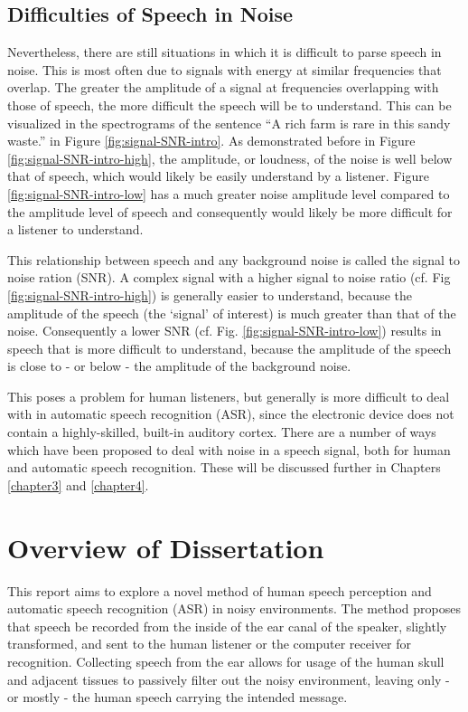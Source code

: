 \subsection{Difficulties of Speech in Noise}\label{sec:snr-difficult}

Nevertheless, there are still situations in which it is difficult to parse speech in noise.  This is most often due to signals with energy at similar frequencies that overlap.  The greater the amplitude of a signal at frequencies overlapping with those of speech, the more difficult the speech will be to understand.  This can be visualized in the spectrograms of the sentence ``A rich farm is rare in this sandy waste.'' in Figure \ref{fig:signal-SNR-intro}.  As demonstrated before in Figure \ref{fig:signal-SNR-intro-high}, the amplitude, or loudness, of the noise is well below that of speech, which would likely be easily understand by a listener.  Figure \ref{fig:signal-SNR-intro-low} has a much greater noise amplitude level compared to the amplitude level of speech and consequently would likely be more difficult for a listener to understand.

This relationship between speech and any background noise is called the signal to noise ration (SNR).  A complex signal with a higher signal to noise ratio (cf. Fig \ref{fig:signal-SNR-intro-high}) is generally easier to understand, because the amplitude of the speech (the `signal' of interest) is much greater than that of the noise.  Consequently a lower SNR (cf. Fig. \ref{fig:signal-SNR-intro-low}) results in speech that is more difficult to understand, because the amplitude of the speech is close to - or below - the amplitude of the background noise.

This poses a problem for human listeners, but generally is more difficult to deal with in automatic speech recognition (ASR), since the electronic device does not contain a highly-skilled, built-in auditory cortex.  There are a number of ways which have been proposed to deal with noise in a speech signal, both for human and automatic speech recognition.  These will be discussed further in Chapters \ref{chapter3} and \ref{chapter4}.

\section{Overview of Dissertation}\label{ch1:diss-overview}

This report aims to explore a novel method of human speech perception and automatic speech recognition (ASR) in noisy environments.  The method proposes that speech be recorded from the inside of the ear canal of the speaker, slightly transformed, and sent to the human listener or the computer receiver for recognition.  Collecting speech from the ear allows for usage of the human skull and adjacent tissues to passively filter out the noisy environment, leaving only - or mostly - the human speech carrying the intended message.  
	

